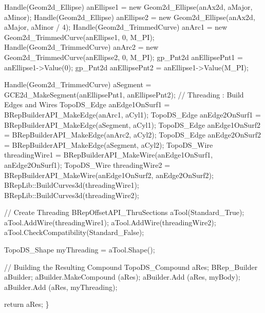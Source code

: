 \begin{DoxyCode}
    Handle(Geom2d\_Ellipse) anEllipse1 = \textcolor{keyword}{new} Geom2d\_Ellipse(anAx2d, aMajor, aMinor);
    Handle(Geom2d\_Ellipse) anEllipse2 = \textcolor{keyword}{new} Geom2d\_Ellipse(anAx2d, aMajor, aMinor / 4);
    Handle(Geom2d\_TrimmedCurve) anArc1 = \textcolor{keyword}{new} Geom2d\_TrimmedCurve(anEllipse1, 0, M\_PI);
    Handle(Geom2d\_TrimmedCurve) anArc2 = \textcolor{keyword}{new} Geom2d\_TrimmedCurve(anEllipse2, 0, M\_PI);
    gp\_Pnt2d anEllipsePnt1 = anEllipse1->Value(0);
    gp\_Pnt2d anEllipsePnt2 = anEllipse1->Value(M\_PI);

    Handle(Geom2d\_TrimmedCurve) aSegment = GCE2d\_MakeSegment(anEllipsePnt1, anEllipsePnt2);
    \textcolor{comment}{// Threading : Build Edges and Wires}
    TopoDS\_Edge anEdge1OnSurf1 = BRepBuilderAPI\_MakeEdge(anArc1, aCyl1);
    TopoDS\_Edge anEdge2OnSurf1 = BRepBuilderAPI\_MakeEdge(aSegment, aCyl1);
    TopoDS\_Edge anEdge1OnSurf2 = BRepBuilderAPI\_MakeEdge(anArc2, aCyl2);
    TopoDS\_Edge anEdge2OnSurf2 = BRepBuilderAPI\_MakeEdge(aSegment, aCyl2);
    TopoDS\_Wire threadingWire1 = BRepBuilderAPI\_MakeWire(anEdge1OnSurf1, anEdge2OnSurf1);
    TopoDS\_Wire threadingWire2 = BRepBuilderAPI\_MakeWire(anEdge1OnSurf2, anEdge2OnSurf2);
    BRepLib::BuildCurves3d(threadingWire1);
    BRepLib::BuildCurves3d(threadingWire2);

    \textcolor{comment}{// Create Threading }
    BRepOffsetAPI\_ThruSections aTool(Standard\_True);
    aTool.AddWire(threadingWire1);
    aTool.AddWire(threadingWire2);
    aTool.CheckCompatibility(Standard\_False);

    TopoDS\_Shape myThreading = aTool.Shape();

    \textcolor{comment}{// Building the Resulting Compound }
    TopoDS\_Compound aRes;
    BRep\_Builder aBuilder;
    aBuilder.MakeCompound (aRes);
    aBuilder.Add (aRes, myBody);
    aBuilder.Add (aRes, myThreading);

    \textcolor{keywordflow}{return} aRes;
\}
\end{DoxyCode}
 
